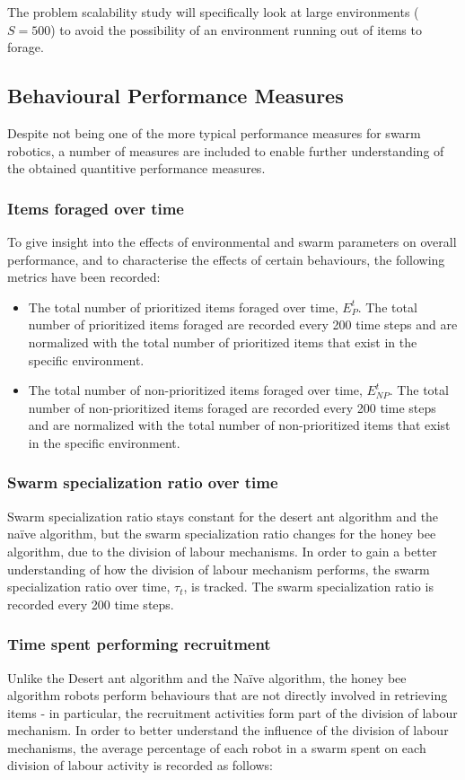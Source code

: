 The problem scalability study will specifically look at large environments ($S=500$) to avoid the possibility of an environment running out of items to forage.

\subsection{Behavioural Performance Measures}
\label{behaviouralperformancemeasures}

Despite not being one of the more typical performance measures for swarm robotics, a number of measures are included to enable further understanding of the obtained quantitive performance measures.

\subsubsection{Items foraged over time}
To give insight into the effects of environmental and swarm parameters on overall performance, and to characterise the effects of certain behaviours, the following metrics have been recorded:

\begin{itemize}
\item The total number of prioritized items foraged over time, $E^t_P$. The total number of prioritized items foraged are recorded every 200 time steps and are normalized with the total number of prioritized items that exist in the specific environment.
\item The total number of non-prioritized items foraged over time, $E^t_{NP}$. The total number of non-prioritized items foraged are recorded every 200 time steps and are normalized with the total number of non-prioritized items that exist in the specific environment.
\end{itemize}

\subsubsection{Swarm specialization ratio over time}
Swarm specialization ratio stays constant for the desert ant algorithm and the na\"ive algorithm, but the swarm specialization ratio changes for the honey bee algorithm, due to the division of labour mechanisms. In order to gain a better understanding of how the division of labour mechanism performs, the swarm specialization ratio over time, $\tau_t$, is tracked. The swarm specialization ratio is recorded every 200 time steps.

\subsubsection{Time spent performing recruitment}
Unlike the Desert ant algorithm and the Na\"ive algorithm, the honey bee algorithm robots perform behaviours that are not directly involved in retrieving items - in particular, the recruitment activities form part of the division of labour mechanism. In order to better understand the influence of the division of labour mechanisms, the average percentage of each robot in a swarm spent on each division of labour activity is recorded as follows:

